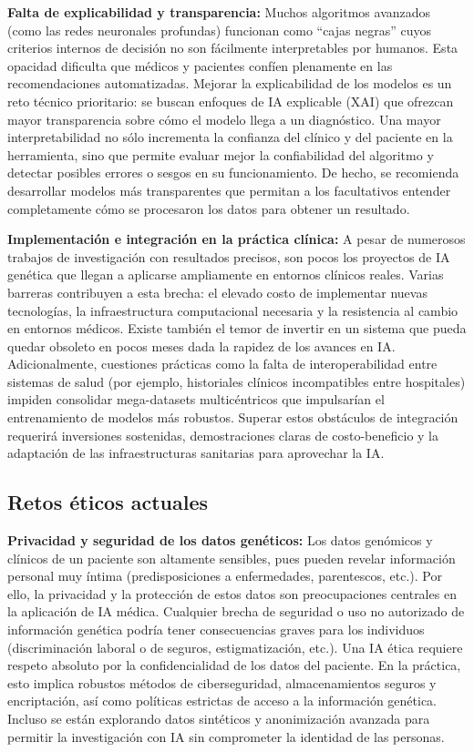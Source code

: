 \documentclass[11pt,a4paper,spanish]{book}
\numberwithin{equation}{chapter}
\numberwithin{figure}{chapter}
\begin{document}
\textbf{Falta de explicabilidad y transparencia:} Muchos algoritmos avanzados (como las redes neuronales profundas) funcionan como ``cajas negras'' cuyos criterios internos de decisión no son fácilmente interpretables por humanos. Esta opacidad dificulta que médicos y pacientes confíen plenamente en las recomendaciones automatizadas. Mejorar la explicabilidad de los modelos es un reto técnico prioritario: se buscan enfoques de IA explicable (XAI) que ofrezcan mayor transparencia sobre cómo el modelo llega a un diagnóstico. Una mayor interpretabilidad no sólo incrementa la confianza del clínico y del paciente en la herramienta, sino que permite evaluar mejor la confiabilidad del algoritmo y detectar posibles errores o sesgos en su funcionamiento. De hecho, se recomienda desarrollar modelos más transparentes que permitan a los facultativos entender completamente cómo se procesaron los datos para obtener un resultado\cite{rudin_2019,Ching_2018,Libbrecht2015}.

\textbf{Implementación e integración en la práctica clínica:} A pesar de numerosos trabajos de investigación con resultados precisos, son pocos los proyectos de IA genética que llegan a aplicarse ampliamente en entornos clínicos reales.
Varias barreras contribuyen a esta brecha: el elevado costo de implementar nuevas tecnologías, la infraestructura computacional necesaria y la resistencia al cambio en entornos médicos. Existe también el temor de invertir en un sistema que pueda quedar obsoleto en pocos meses dada la rapidez de los avances en IA. Adicionalmente, cuestiones prácticas como la falta de interoperabilidad entre sistemas de salud (por ejemplo, historiales clínicos incompatibles entre hospitales) impiden consolidar mega-datasets multicéntricos que impulsarían el entrenamiento de modelos más robustos. 
Superar estos obstáculos de integración requerirá inversiones sostenidas, demostraciones claras de costo-beneficio y la adaptación de las infraestructuras sanitarias para aprovechar la IA\cite{rajkomar_2019,pranav_ia,Ginsburg_2018,economic_stjhon}.

\subsection{Retos éticos actuales}

\textbf{Privacidad y seguridad de los datos genéticos:} Los datos genómicos y clínicos de un paciente son altamente sensibles, pues pueden revelar información personal muy íntima (predisposiciones a enfermedades, parentescos, etc.). Por ello, la privacidad y la protección de estos datos son preocupaciones centrales en la aplicación de IA médica. Cualquier brecha de seguridad o uso no autorizado de información genética podría tener consecuencias graves para los individuos (discriminación laboral o de seguros, estigmatización, etc.). Una IA ética requiere respeto absoluto por la confidencialidad de los datos del paciente. En la práctica, esto implica robustos métodos de ciberseguridad, almacenamientos seguros y encriptación, así como políticas estrictas de acceso a la información genética. Incluso se están explorando datos sintéticos y anonimización avanzada para permitir la investigación con IA sin comprometer la identidad de las personas\cite{pranav_ia,rajkomar_2019,Ching_2018}.
\end{document}
